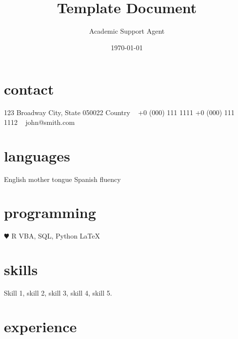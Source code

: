 \documentclass{article}
\title{Template Document}
\author{Academic Support Agent}
\date{\today}
\begin{document}
\maketitle

\lastupdated


\begin{aside}
%
\section{contact}
123 Broadway
City, State 050022
Country
~
+0 (000) 111 1111
+0 (000) 111 1112
~
john@smith.com
%
\section{languages}
English mother tongue
Spanish fluency
%
\section{programming}
{\color{red} $\varheartsuit$} R
VBA, SQL, Python
\LaTeX{}
%
\end{aside}


\section{skills}
  \vspace{-0.2cm}

Skill 1, skill 2, skill 3, skill 4, skill 5.


\section{experience}
\end{document}
